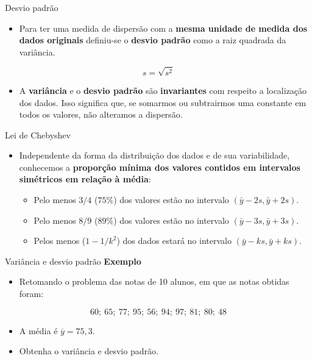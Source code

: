 \documentclass[
  ignorenonframetext,
  serif,
  professionalfont,
  usenames,
  dvipsnames,
  aspectratio = 169]{beamer}
\providecommand{\tightlist}{%
  \setlength{\itemsep}{0pt}\setlength{\parskip}{0pt}}
\renewcommand{\tightlist}{%
  \setlength{\itemsep}{0\baselineskip}
  \setlength{\parskip}{0.25\baselineskip}
}
\begin{document}
\begin{frame}{Desvio padrão}
\label{desvio-padruxe3o}
\begin{itemize}
\tightlist
\item
  Para ter uma medida de dispersão com a
  \textbf{mesma unidade de medida dos dados originais} definiu-se o
  \textbf{desvio padrão} como a raiz quadrada da variância.
\end{itemize}

\[
s = \sqrt{s^2}
\]

\begin{itemize}
\tightlist
\item
  A \textbf{variância} e o \textbf{desvio padrão} são
  \textbf{invariantes} com respeito a localização dos dados. Isso
  significa que, se somarmos ou subtrairmos uma constante em todos os
  valores, não alteramos a dispersão.
\end{itemize}
\end{frame}

\begin{frame}{Lei de Chebyshev}
\label{lei-de-chebyshev}
\begin{itemize}
\item
  Independente da forma da distribuição dos dados e de sua
  variabilidade, conhecemos a
  \textbf{proporção mínima dos valores contidos em intervalos simétricos em relação à média}:

  \begin{itemize}
  \item
    Pelo menos \(3/4\) (\(75\%\)) dos valores estão no intervalo
    \((\bar{y} - 2s, \bar{y} + 2s)\).
  \item
    Pelo menos \(8/9\) (\(89\%\)) dos valores estão no intervalo
    \((\bar{y} - 3s, \bar{y} + 3s)\).
  \item
    Pelos menos (\(1 - 1/k^2\)) dos dados estará no intervalo
    \((\bar{y} - ks, \bar{y} + ks)\).
  \end{itemize}
\end{itemize}
\end{frame}

\begin{frame}{Variância e desvio padrão}
\label{variuxe2ncia-e-desvio-padruxe3o}
\textbf{Exemplo}

\begin{itemize}
\tightlist
\item
  Retomando o problema das notas de 10 alunos, em que as notas obtidas
  foram:
\end{itemize}

\[60;\ 65;\ 77;\ 95;\ 56;\ 94;\ 97;\ 81;\ 80;\ 48\]

\begin{itemize}
\item
  A média é \(\overline{y} = 75,3\).
\item
  Obtenha o variância e desvio padrão.
\end{itemize}
\end{frame}
\end{document}
